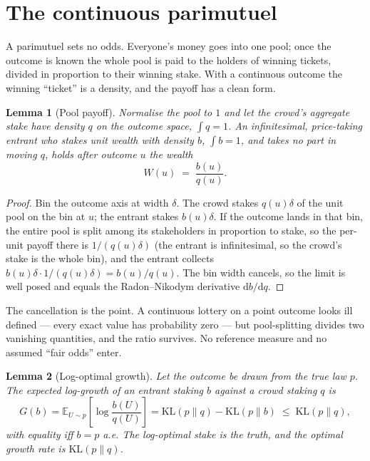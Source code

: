 \documentclass[11pt]{article}
\newtheorem{lemma}{Lemma}
\begin{document}
\section{The continuous parimutuel}

A parimutuel sets no odds. Everyone's money goes into one pool; once the outcome is known the whole
pool is paid to the holders of winning tickets, divided in proportion to their winning stake. With a
continuous outcome the winning ``ticket'' is a density, and the payoff has a clean form.

\begin{lemma}[Pool payoff]\label{lem:payoff}
Normalise the pool to $1$ and let the crowd's aggregate stake have density $q$ on the outcome space,
$\int q=1$. An infinitesimal, price-taking entrant who stakes unit wealth with density $b$,
$\int b=1$, and takes no part in moving $q$, holds after outcome $u$ the wealth
\begin{equation}
W(u)\;=\;\frac{b(u)}{q(u)} .
\end{equation}
\end{lemma}

\begin{proof}
Bin the outcome axis at width $\delta$. The crowd stakes $q(u)\delta$ of the unit pool on the bin at
$u$; the entrant stakes $b(u)\delta$. If the outcome lands in that bin, the entire pool is split
among its stakeholders in proportion to stake, so the per-unit payoff there is $1/(q(u)\delta)$ (the
entrant is infinitesimal, so the crowd's stake is the whole bin), and the entrant collects
$b(u)\delta \cdot 1/(q(u)\delta)=b(u)/q(u)$. The bin width cancels, so the limit is well posed and
equals the Radon--Nikodym derivative $\mathrm db/\mathrm dq$.
\end{proof}

The cancellation is the point. A continuous lottery on a point outcome looks ill defined --- every
exact value has probability zero --- but pool-splitting divides two vanishing quantities, and the
ratio survives. No reference measure and no assumed ``fair odds'' enter.

\begin{lemma}[Log-optimal growth]\label{lem:growth}
Let the outcome be drawn from the true law $p$. The expected log-growth of an entrant staking $b$
against a crowd staking $q$ is
\begin{equation}
G(b)=\mathbb E_{U\sim p}\!\left[\log\frac{b(U)}{q(U)}\right]
=\mathrm{KL}(p\|q)-\mathrm{KL}(p\|b)\;\le\;\mathrm{KL}(p\|q),
\end{equation}
with equality iff $b=p$ a.e. The log-optimal stake is the truth, and the optimal growth rate is
$\mathrm{KL}(p\|q)$.
\end{lemma}
\end{document}
